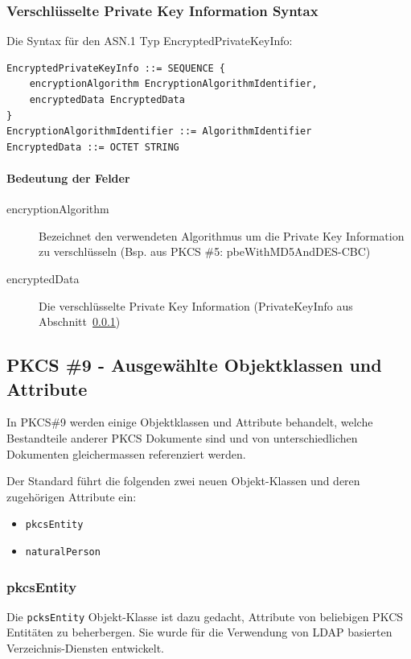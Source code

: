 \documentclass[10pt,a4paper]{article}
\begin{document}
\subsubsection{Verschlüsselte Private Key Information Syntax}
\label{sec:private-key-info}
Die Syntax für den ASN.1 Typ EncryptedPrivateKeyInfo:
\begin{verbatim}
EncryptedPrivateKeyInfo ::= SEQUENCE {
    encryptionAlgorithm EncryptionAlgorithmIdentifier,
    encryptedData EncryptedData
}
EncryptionAlgorithmIdentifier ::= AlgorithmIdentifier
EncryptedData ::= OCTET STRING
\end{verbatim}

\paragraph{Bedeutung der Felder}
\begin{description}
    \item[encryptionAlgorithm] Bezeichnet den verwendeten Algorithmus um die Private Key
        Information zu verschlüsseln (Bsp. aus PKCS \#5: pbeWithMD5AndDES-CBC)
    \item[encryptedData] Die verschlüsselte Private Key Information (PrivateKeyInfo aus
        Abschnitt~\ref{sec:private-key-info})
\end{description}

\subsection{PKCS \#9 - Ausgewählte Objektklassen und Attribute}
In PKCS\#9 werden einige Objektklassen und Attribute behandelt, welche Bestandteile
anderer PKCS Dokumente sind und von unterschiedlichen Dokumenten gleichermassen
referenziert werden.

Der Standard führt die folgenden zwei neuen Objekt-Klassen und deren zugehörigen Attribute
ein:
\begin{itemize}
    \item \texttt{pkcsEntity}
    \item \texttt{naturalPerson}
\end{itemize}

\subsubsection{pkcsEntity}
Die \texttt{pcksEntity} Objekt-Klasse ist dazu gedacht, Attribute von beliebigen PKCS
Entitäten zu beherbergen. Sie wurde für die Verwendung von LDAP basierten
Verzeichnis-Diensten entwickelt.
\end{document}
